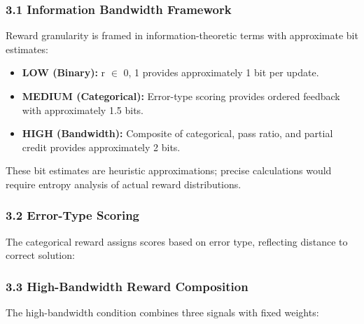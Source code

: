 
\subsubsection{3.1 Information Bandwidth Framework}

Reward granularity is framed in information-theoretic terms with approximate bit estimates:

\begin{itemize}
\item \textbf{LOW (Binary):} r $\in$ {0, 1} provides approximately 1 bit per update.
\item \textbf{MEDIUM (Categorical):} Error-type scoring provides ordered feedback with approximately 1.5 bits.
\item \textbf{HIGH (Bandwidth):} Composite of categorical, pass ratio, and partial credit provides approximately 2 bits.
\end{itemize}

These bit estimates are heuristic approximations; precise calculations would require entropy analysis of actual reward distributions.

\subsubsection{3.2 Error-Type Scoring}

The categorical reward assigns scores based on error type, reflecting distance to correct solution:

\begin{table}[htbp]
\centering
{}
\end{table}

\subsubsection{3.3 High-Bandwidth Reward Composition}

The high-bandwidth condition combines three signals with fixed weights:

